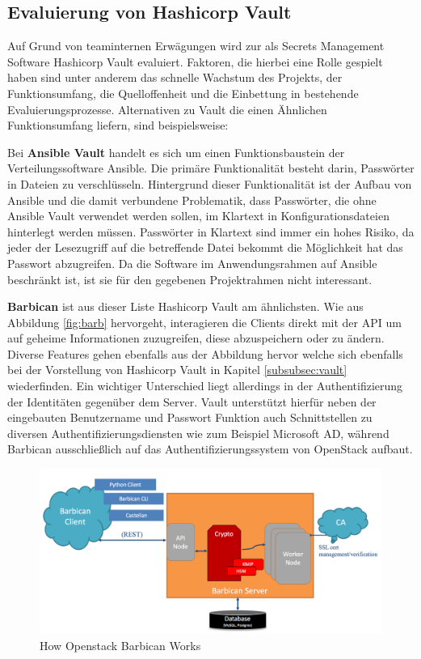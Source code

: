 \documentclass[
book,
a4paper,   
titlepage,  
halfparskip,
12pt        
]{scrartcl}
\begin{document}
\begin{onehalfspacing}
\section{Evaluierung von Hashicorp Vault}
\label{sec:eval}
Auf Grund von teaminternen Erwägungen wird zur als Secrets Management Software Hashicorp Vault evaluiert. Faktoren, die hierbei eine Rolle gespielt haben sind unter anderem das schnelle Wachstum des Projekts, der Funktionsumfang, die Quelloffenheit und die Einbettung in bestehende Evaluierungsprozesse. Alternativen zu Vault die einen Ähnlichen Funktionsumfang liefern, sind beispielsweise:\cite{github}

Bei \textbf{Ansible Vault} handelt es sich um einen Funktionsbaustein der Verteilungssoftware Ansible. Die primäre Funktionalität besteht darin, Passwörter in Dateien zu verschlüsseln. Hintergrund dieser Funktionalität ist der Aufbau von Ansible und die damit verbundene Problematik, dass Passwörter, die ohne Ansible Vault verwendet werden sollen, im Klartext in Konfigurationsdateien hinterlegt werden müssen. Passwörter in Klartext sind immer ein hohes Risiko, da jeder der Lesezugriff auf die betreffende Datei bekommt die Möglichkeit hat das Passwort abzugreifen.\cite{ansible} Da die Software im Anwendungsrahmen auf Ansible beschränkt ist, ist sie für den gegebenen Projektrahmen nicht interessant.

\textbf{Barbican} ist aus dieser Liste Hashicorp Vault am ähnlichsten. Wie aus Abbildung \vref{fig:barb} hervorgeht, interagieren die Clients direkt mit der \ac{API} um auf geheime Informationen zuzugreifen, diese abzuspeichern oder zu ändern. Diverse Features gehen ebenfalls aus der Abbildung hervor welche sich ebenfalls bei der Vorstellung von Hashicorp Vault in Kapitel \vref{subsubsec:vault} wiederfinden. Ein wichtiger Unterschied liegt allerdings in der Authentifizierung der Identitäten gegenüber dem Server. Vault unterstützt hierfür neben der eingebauten Benutzername und Passwort Funktion auch Schnittstellen zu diversen Authentifizierungsdiensten wie zum Beispiel Microsoft \ac{AD}, während Barbican ausschließlich auf das Authentifizierungssystem von OpenStack aufbaut.\cite[S. 4f]{barbican}
\begin{figure}[h]
	\centering
	\includegraphics[width=1\linewidth]{barbican}
	\caption[Barbican]{How Openstack Barbican Works \cite[S. 4]{barbican}}
	\label{fig:barb}
\end{figure}


\end{onehalfspacing}
\end{document}
